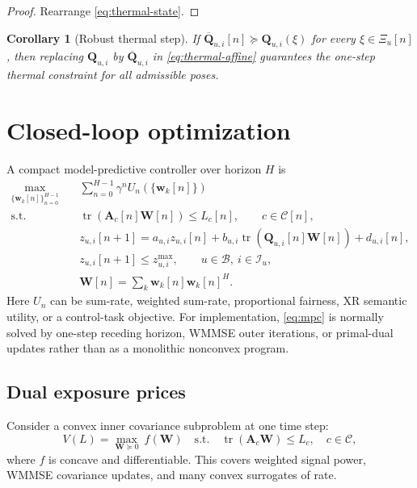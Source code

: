 \documentclass[11pt,a4paper]{article}
\theoremstyle{definition}
\theoremstyle{plain}
\newtheorem{corollary}[definition]{Corollary}
\newcommand{\ww}{\mathbf w}
\newcommand{\W}{\mathbf W}
\newcommand{\Q}{\mathbf Q}
\newcommand{\Qbar}{\overline{\mathbf Q}}
\newcommand{\A}{\mathbf A}
\newcommand{\Bodies}{\mathcal B}
\newcommand{\Patches}{\mathcal I}
\newcommand{\Constraints}{\mathcal C}
\newcommand{\tr}{\operatorname{tr}}
\begin{document}
\begin{proof}
Rearrange \eqref{eq:thermal-state}.
\end{proof}

\begin{corollary}[Robust thermal step]
If $\Qbar_{u,i}[n]\succeq\Q_{u,i}(\xi)$ for every
$\xi\in\Xi_u[n]$, then replacing $\Q_{u,i}$ by $\Qbar_{u,i}$ in
\eqref{eq:thermal-affine} guarantees the one-step thermal constraint for
all admissible poses.
\end{corollary}

\section{Closed-loop optimization}

A compact model-predictive controller over horizon $H$ is
\begin{equation}\label{eq:mpc}
\begin{aligned}
\max_{\{\ww_k[n]\}_{n=0}^{H-1}}\quad&
  \sum_{n=0}^{H-1}\gamma^n U_n(\{\ww_k[n]\})\\
\text{s.t.}\quad&
  \tr(\A_c[n]\W[n])\le L_c[n],
  \qquad c\in\Constraints[n],\\
& z_{u,i}[n+1]=a_{u,i}z_{u,i}[n]
  +b_{u,i}\tr(\Q_{u,i}[n]\W[n])+d_{u,i}[n],\\
& z_{u,i}[n+1]\le z_{u,i}^{\max},
  \qquad u\in\Bodies,\ i\in\Patches_u,\\
& \W[n]=\sum_k\ww_k[n]\ww_k[n]^H.
\end{aligned}
\end{equation}
Here $U_n$ can be sum-rate, weighted sum-rate, proportional fairness,
XR semantic utility, or a control-task objective.  For implementation,
\eqref{eq:mpc} is normally solved by one-step receding horizon, WMMSE
outer iterations, or primal-dual updates rather than as a monolithic
nonconvex program.

\subsection{Dual exposure prices}

Consider a convex inner covariance subproblem at one time step:
\begin{equation}\label{eq:convex-inner}
  V(L)=
  \max_{\W\succeq0}\ f(\W)
  \quad\text{s.t.}\quad
  \tr(\A_c\W)\le L_c,\quad c\in\Constraints,
\end{equation}
where $f$ is concave and differentiable.  This covers weighted signal
power, WMMSE covariance updates, and many convex surrogates of rate.
\end{document}
